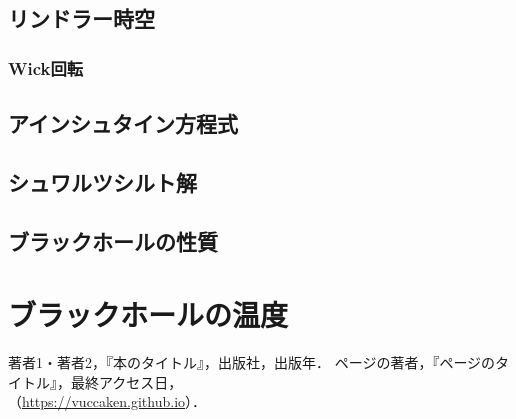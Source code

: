 \documentclass[uplatex,dvipdfmx]{vkaishi}
\begin{document}
\subsection{リンドラー時空}
\subsubsection{Wick回転}

\subsection{アインシュタイン方程式}

\subsection{シュワルツシルト解}

\subsection{ブラックホールの性質}








\section{ブラックホールの温度}


\begin{thebibliography}{99}
   著者1・著者2，『本のタイトル』，出版社，出版年．
   ページの著者，『ページのタイトル』，最終アクセス日，\\（\url{https://vuccaken.github.io}）．
\end{thebibliography}
\end{document}
